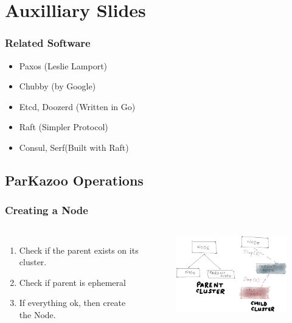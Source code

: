 \documentclass[10pt, compress]{beamer}
\begin{document}

\section{Auxilliary Slides}

\begin{frame}
    \frametitle{Related Software}
    \begin{itemize}
        \item Paxos (Leslie Lamport)
        \item Chubby (by Google)
        \item Etcd, Doozerd (Written in Go)
        \item Raft (Simpler Protocol)
        \item Consul, Serf(Built with Raft)
    \end{itemize}
\end{frame}

\subsection{ParKazoo Operations}
\begin{frame}[fragile]
    \frametitle{Creating a Node}
    \begin{columns}[onlytextwidth]
        \begin{enumerate}
            \item Check if the parent exists on its cluster.
            \item Check if parent is ephemeral
            \item If everything ok, then create the Node.
        \end{enumerate}
        \begin{figure}[ht!]
            \centering
            \includegraphics[width=60mm]{images/ParKazooCreate.png}
        \end{figure}
    \end{columns}
\end{frame}
\end{document}

